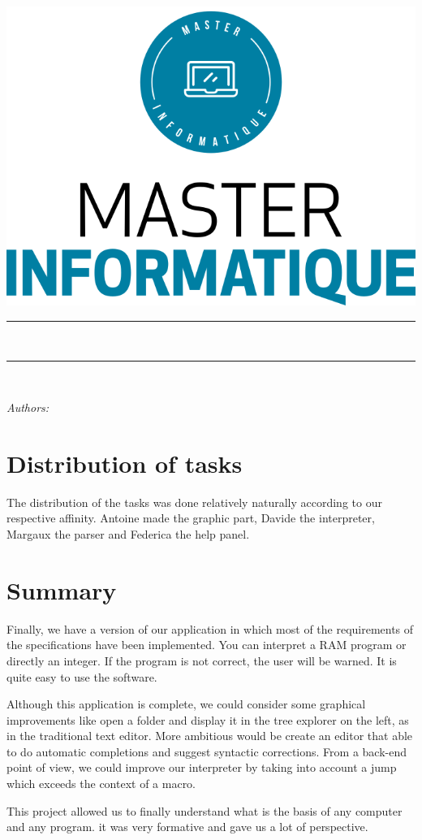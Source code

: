 \documentclass[a4paper,12pt]{article}
\makeatletter
\def\maketitle{
  \begin{center}\leavevmode
       \normalfont
       \includegraphics[width=0.6\columnwidth]{images/logo_master.png}
       \vskip 0.5cm
       \vskip 1.5cm
       \rule{\linewidth}{0.2 mm} 
       {\large \exam}\\[1 cm]
       {\huge \bfseries \@title \par}
       \vspace{1cm}
	\rule{\linewidth}{0.2 mm} \\[1.5 cm]

	\begin{minipage}[t]{0.45\textwidth}
		\begin{flushleft} \large
			\emph{Authors:}\\
			\@author
		\end{flushleft}
	\end{minipage}
	\begin{minipage}[t]{0.45\textwidth}
	    \begin{flushright} \large
			\ifdefempty{\supervisortwo}{\emph{Supervisor:\\}}{\emph{Professor:\\}}
			\supervisorone
		\end{flushright}
	\end{minipage}
	\vfill
	{\Large \@date\par}
   \end{center}
   \cleardoublepage
  }
\makeatother
\begin{document}

\maketitle

\tableofcontents

\newpage














\section{Distribution of tasks}
The distribution of the tasks was done relatively naturally according to our respective affinity. Antoine made the graphic part, Davide the interpreter, Margaux the parser and Federica the help panel. 

\section{Summary}
Finally, we have a version of our application in which most of the requirements of the specifications have been implemented. You can interpret a RAM program or directly an integer. If the program is not correct, the user will be warned. It is quite easy to use the software.

Although this application is complete, we could consider some graphical improvements like open a folder and display it in the tree explorer on the left, as in the traditional text editor. More ambitious would be create an editor that able to do automatic completions and suggest syntactic corrections. From a back-end point of view, we could improve our interpreter by taking into account a jump which exceeds the context of a macro.

This project allowed us to finally understand what is the basis of any computer and any program. it was very formative and gave us a lot of perspective.

\end{document}
